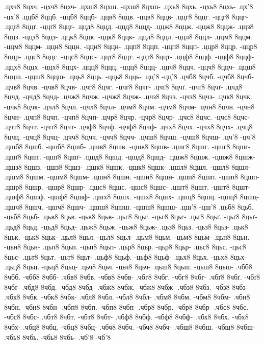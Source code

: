 {.цхч8 8цхч. -цхч8 8цхч-
.цхш8 8цхш. -цхш8 8цхш-
.цхь8 8цхь. -цхь8 8цхь-
.цх'8 -цх'8
.ццб8 8ццб. -ццб8 8ццб-
.ццв8 8ццв. -ццв8 8ццв-
.ццг8 8ццг. -ццг8 8ццг-
.ццґ8 8ццґ. -ццґ8 8ццґ-
.ццд8 8ццд. -ццд8 8ццд-
.ццж8 8ццж. -ццж8 8ццж-
.ццз8 8ццз. -ццз8 8ццз-
.ццк8 8ццк. -ццк8 8ццк-
.ццл8 8ццл. -ццл8 8ццл-
.ццм8 8ццм. -ццм8 8ццм-
.ццн8 8ццн. -ццн8 8ццн-
.ццп8 8ццп. -ццп8 8ццп-
.ццр8 8ццр. -ццр8 8ццр-
.ццс8 8ццс. -ццс8 8ццс-
.ццт8 8ццт. -ццт8 8ццт-
.ццф8 8ццф. -ццф8 8ццф-
.ццх8 8ццх. -ццх8 8ццх-
.ццц8 8ццц. -ццц8 8ццц-
.ццч8 8ццч. -ццч8 8ццч-
.ццш8 8ццш. -ццш8 8ццш-
.цць8 8цць. -цць8 8цць-
.цц'8 -цц'8
.цчб8 8цчб. -цчб8 8цчб-
.цчв8 8цчв. -цчв8 8цчв-
.цчг8 8цчг. -цчг8 8цчг-
.цчґ8 8цчґ. -цчґ8 8цчґ-
.цчд8 8цчд. -цчд8 8цчд-
.цчж8 8цчж. -цчж8 8цчж-
.цчз8 8цчз. -цчз8 8цчз-
.цчк8 8цчк. -цчк8 8цчк-
.цчл8 8цчл. -цчл8 8цчл-
.цчм8 8цчм. -цчм8 8цчм-
.цчн8 8цчн. -цчн8 8цчн-
.цчп8 8цчп. -цчп8 8цчп-
.цчр8 8цчр. -цчр8 8цчр-
.цчс8 8цчс. -цчс8 8цчс-
.цчт8 8цчт. -цчт8 8цчт-
.цчф8 8цчф. -цчф8 8цчф-
.цчх8 8цчх. -цчх8 8цчх-
.цчц8 8цчц. -цчц8 8цчц-
.цчч8 8цчч. -цчч8 8цчч-
.цчш8 8цчш. -цчш8 8цчш-
.цч'8 -цч'8
.цшб8 8цшб. -цшб8 8цшб-
.цшв8 8цшв. -цшв8 8цшв-
.цшг8 8цшг. -цшг8 8цшг-
.цшґ8 8цшґ. -цшґ8 8цшґ-
.цшд8 8цшд. -цшд8 8цшд-
.цшж8 8цшж. -цшж8 8цшж-
.цшз8 8цшз. -цшз8 8цшз-
.цшк8 8цшк. -цшк8 8цшк-
.цшл8 8цшл. -цшл8 8цшл-
.цшм8 8цшм. -цшм8 8цшм-
.цшн8 8цшн. -цшн8 8цшн-
.цшп8 8цшп. -цшп8 8цшп-
.цшр8 8цшр. -цшр8 8цшр-
.цшс8 8цшс. -цшс8 8цшс-
.цшт8 8цшт. -цшт8 8цшт-
.цшф8 8цшф. -цшф8 8цшф-
.цшх8 8цшх. -цшх8 8цшх-
.цшц8 8цшц. -цшц8 8цшц-
.цшч8 8цшч. -цшч8 8цшч-
.цшш8 8цшш. -цшш8 8цшш-
.цш'8 -цш'8
.цьб8 8цьб. -цьб8 8цьб-
.цьв8 8цьв. -цьв8 8цьв-
.цьг8 8цьг. -цьг8 8цьг-
.цьґ8 8цьґ. -цьґ8 8цьґ-
.цьд8 8цьд. -цьд8 8цьд-
.цьж8 8цьж. -цьж8 8цьж-
.цьз8 8цьз. -цьз8 8цьз-
.цьк8 8цьк. -цьк8 8цьк-
.цьл8 8цьл. -цьл8 8цьл-
.цьм8 8цьм. -цьм8 8цьм-
.цьн8 8цьн. -цьн8 8цьн-
.цьп8 8цьп. -цьп8 8цьп-
.цьр8 8цьр. -цьр8 8цьр-
.цьс8 8цьс. -цьс8 8цьс-
.цьт8 8цьт. -цьт8 8цьт-
.цьф8 8цьф. -цьф8 8цьф-
.цьх8 8цьх. -цьх8 8цьх-
.цьц8 8цьц. -цьц8 8цьц-
.цьч8 8цьч. -цьч8 8цьч-
.цьш8 8цьш. -цьш8 8цьш-
.чбб8 8чбб. -чбб8 8чбб-
.чбв8 8чбв. -чбв8 8чбв-
.чбг8 8чбг. -чбг8 8чбг-
.чбґ8 8чбґ. -чбґ8 8чбґ-
.чбд8 8чбд. -чбд8 8чбд-
.чбж8 8чбж. -чбж8 8чбж-
.чбз8 8чбз. -чбз8 8чбз-
.чбк8 8чбк. -чбк8 8чбк-
.чбл8 8чбл. -чбл8 8чбл-
.чбм8 8чбм. -чбм8 8чбм-
.чбн8 8чбн. -чбн8 8чбн-
.чбп8 8чбп. -чбп8 8чбп-
.чбр8 8чбр. -чбр8 8чбр-
.чбс8 8чбс. -чбс8 8чбс-
.чбт8 8чбт. -чбт8 8чбт-
.чбф8 8чбф. -чбф8 8чбф-
.чбх8 8чбх. -чбх8 8чбх-
.чбц8 8чбц. -чбц8 8чбц-
.чбч8 8чбч. -чбч8 8чбч-
.чбш8 8чбш. -чбш8 8чбш-
.чбь8 8чбь. -чбь8 8чбь-
.чб'8 -чб'8
}
